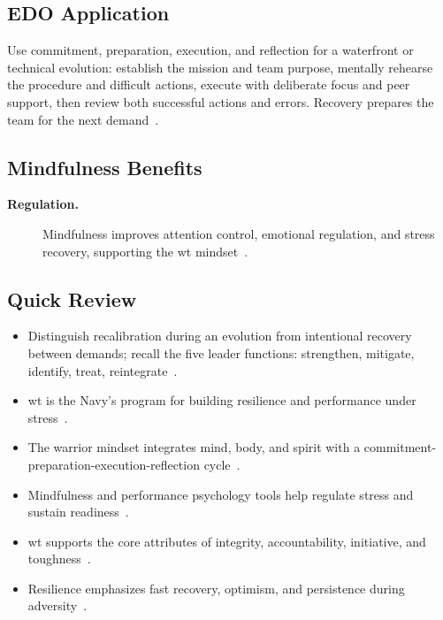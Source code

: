 \documentclass[../main.tex]{subfiles}
\begin{document}
\subsection{EDO Application}
Use commitment, preparation, execution, and reflection for a waterfront or technical evolution: establish the mission and team purpose, mentally rehearse the procedure and difficult actions, execute with deliberate focus and peer support, then review both successful actions and errors. Recovery prepares the team for the next demand~\autocite[slide 27]{edo-5-2-8-warrior-toughness-2025}.

\subsection{Mindfulness Benefits}
\begin{description}
  \item[\textbf{Regulation.}] Mindfulness improves attention control, emotional regulation, and stress
  recovery, supporting the \ac{wt} mindset~\autocite{edo-5-2-8-warrior-toughness-2025}.
\end{description}

\subsection{Quick Review}
\begin{itemize}
  \item Distinguish recalibration during an evolution from intentional recovery between demands; recall the five leader functions: strengthen, mitigate, identify, treat, reintegrate~\autocite{edo-5-2-8-warrior-toughness-2025}.
  \item \ac{wt} is the Navy's program for building resilience and performance under stress~\autocite{edo-5-2-8-warrior-toughness-2025,NETC-Warrior-Toughness-2026}.
  \item The warrior mindset integrates mind, body, and spirit with a commitment-preparation-execution-reflection cycle~\autocite{edo-5-2-8-warrior-toughness-2025,NETC-Warrior-Toughness-Components-2026}.
  \item Mindfulness and performance psychology tools help regulate stress and sustain readiness~\autocite{edo-5-2-8-warrior-toughness-2025,NETC-Warrior-Toughness-Components-2026}.
  \item \ac{wt} supports the core attributes of integrity, accountability, initiative, and toughness~\autocite{edo-5-2-8-warrior-toughness-2025,NETC-Warrior-Toughness-Components-2026}.
  \item Resilience emphasizes fast recovery, optimism, and persistence during adversity~\autocite{edo-5-2-8-warrior-toughness-2025}.
\end{itemize}

\end{document}
